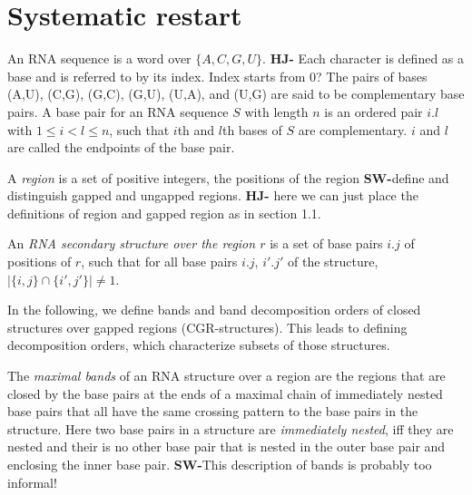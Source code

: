 \documentclass[11pt]{article} %
\newcommand{\SW}[1]{\textbf{SW-}#1}
\begin{document}

\newpage
\section{Systematic restart}
\label{sec:pdecomposition}

\newcommand{\CGR}{CGR} %
\newcommand{\CR}{CR}   %
    

An RNA sequence is a word over $\{A,C,G,U\}.$
\textbf{HJ-} Each character is defined as a base and is referred to by its index. Index starts from 0?
The pairs of bases (A,U), (C,G), (G,C), (G,U), (U,A), and (U,G) are said to be complementary base pairs.
A base pair for an RNA sequence $S$ with length $n$ is an ordered pair $i.l$ with $1 \leq i <l \leq n$, such that $i$th and $l$th bases of $S$ are complementary. $i$ and $l$ are called the endpoints of the base pair. 

A \emph{region} is a set of positive integers, the positions of the region \SW{define and distinguish gapped and ungapped regions}. \textbf{HJ-} here we can just place the definitions of region and gapped region as in section 1.1.

An \emph{RNA secondary structure over the region $r$} is a set of base pairs $i.j$ of positions of $r$, such that for all base pairs $i.j$, $i'.j'$ of the structure,
$|\{i,j\}\cap\{i',j'\}|\neq 1.$


In the following, we define bands and band decomposition orders of closed structures over gapped regions (\CGR-structures). This leads to defining decomposition orders, which characterize subsets of those structures.

The \emph{maximal bands} of an RNA structure over a region are the regions that are closed by the base pairs at the ends of a maximal chain of immediately nested base pairs that all have the same crossing pattern to the base pairs in the structure. Here two base pairs in a structure are \emph{immediately nested}, iff they are nested and their is no other base pair that is nested in the outer base pair and enclosing the inner base pair. \SW{This description of bands is probably too informal!}
\end{document}
